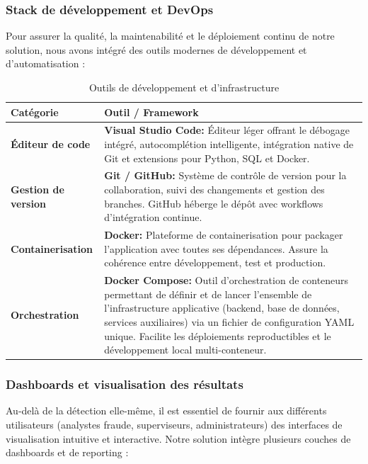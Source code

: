 \documentclass[a4paper, oneside, 12pt]{book}
\newcommand{\thead}[1]{\cellcolor{EYdark}\textcolor{white}{\textbf{#1}}}
\renewcommand{\thead}[1]{\cellcolor{EYyellow}\textcolor{EYdark}{\textbf{#1}}}
\begin{document}
\newpage
\subsubsection{Stack de développement et DevOps}

\hspace{0.5cm}Pour assurer la qualité, la maintenabilité et le déploiement continu de notre solution, nous avons intégré des outils modernes de développement et d'automatisation :

\begin{table}[H]
\centering
\renewcommand{\arraystretch}{1.5}
\begin{tabular}{|p{3.5cm}|p{11.8cm}|}
\hline
\thead{Catégorie} & \thead{Outil / Framework} \\
\hline
\textbf{Éditeur de code} & \textbf{Visual Studio Code:} Éditeur léger offrant le débogage intégré, autocomplétion intelligente, intégration native de Git et extensions pour Python, SQL et Docker. \\
\hline
\textbf{Gestion de version} & \textbf{Git / GitHub:} Système de contrôle de version pour la collaboration, suivi des changements et gestion des branches. GitHub héberge le dépôt avec workflows d'intégration continue. \\
\hline
\textbf{Containerisation} & \textbf{Docker:} Plateforme de containerisation pour packager l'application avec toutes ses dépendances. Assure la cohérence entre développement, test et production. \\
\hline
\textbf{Orchestration} & \textbf{Docker Compose:} Outil d'orchestration de conteneurs permettant de définir et de lancer l'ensemble de l'infrastructure applicative (backend, base de données, services auxiliaires) via un fichier de configuration YAML unique. Facilite les déploiements reproductibles et le développement local multi-conteneur. \\
\hline
\end{tabular}
\caption{Outils de développement et d'infrastructure}
\end{table}


\subsubsection{Dashboards et visualisation des résultats}
\hspace{0.5cm}Au-delà de la détection elle-même, il est essentiel de fournir aux différents utilisateurs (analystes fraude, superviseurs, administrateurs) des interfaces de visualisation intuitive et interactive. Notre solution intègre plusieurs couches de dashboards et de reporting :
\end{document}
